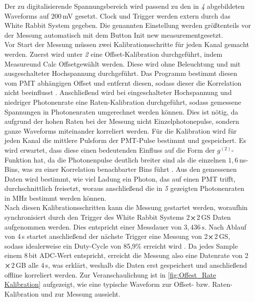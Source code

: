 Der zu digitalisierende Spannungsbereich wird passend zu den in \emph{4} abgebildeten Waveforms auf 200\,mV gesetzt. 
Clock und Trigger werden extern durch das White Rabbit System gegeben. 
Die genannten Einstellung werden größtenteils vor der Messung automatisch mit dem Button \glqq Init new measurement\grqq\;gesetzt. \\
Vor Start der Messung müssen zwei Kalibrationsschritte für jeden Kanal gemacht werden. 
Zuerst wird unter \emph{2} eine Offset-Kalibration durchgeführt, indem \glqq Measure\grqq\;und \glqq Calc Offset\grqq\;gewählt werden. 
Diese wird ohne Beleuchtung und mit ausgeschalteter Hochspannung durchgeführt. 
Das Programm bestimmt diesen vom PMT abhängigen Offset und entfernt diesen, sodass dieser die Korrelation nicht beeinflusst \cite{zmijaOpticalIntensityInterferometry2021}. 
Anschließend wird bei eingeschalteter Hochspannung und niedriger Photonenrate eine Raten-Kalibration durchgeführt, sodass gemessene Spannungen in Photonenraten umgerechnet werden können. 
Dies ist nötig, da aufgrund der hohen Raten bei der Messung nicht Einzelphotonepulse, sondern ganze Waveforms miteinander korreliert werden. 
Für die Kalibration wird für jeden Kanal die mittlere Pulsform der PMT-Pulse bestimmt und gespeichert. 
Es wird erwartet, dass diese einen bedeutenden Einfluss auf die Form der $g^{(2)}$-Funktion hat, da die Photonenpulse deutlich breiter sind als die einzelnen $1{,}6$\,ns-Bins, was zu einer Korrelation benachbarter Bins führt \cite{zmijaOpticalIntensityInterferometry2021}. 
Aus den gemessenen Daten wird bestimmt, wie viel Ladung ein Photon, das auf einen PMT trifft, durchschnittlich freisetzt, woraus anschließend die in \emph{5} gezeigten Photonenraten in MHz bestimmt werden können. \\
Nach diesen Kalibrationsschritten kann die Messung gestartet werden, woraufhin synchronisiert durch den Trigger des White Rabbit Systems 2$\cross$2\,GS Daten aufgenommen werden. 
Dies entspricht einer Messdauer von $3{,}436\,\mathrm{s}$. 
Nach Ablauf von 4\,s startet anschließend der nächste Trigger eine Messung von 2$\cross$2\,GS, sodass idealerweise ein Duty-Cycle von 85{,}9\% erreicht wird \cite{zmijaFirstIntensityInterferometry2023}. 
Da jedes Sample einem 8\,bit ADC-Wert entspricht, erreicht die Messung also eine Datenrate von 2$\cross$2\,GB alle 4\,s, was erklärt, weshalb die Daten erst gespeichert und anschließend offline korreliert werden. 
Zur Veranschaulichung ist in \autoref{fig:Offest_Rate Kalibration} aufgezeigt, wie eine typische Waveform zur Offset- bzw. Raten-Kalibration und zur Messung aussieht. 

